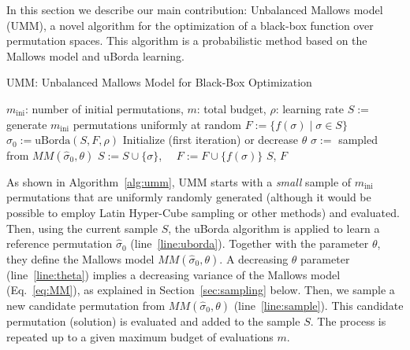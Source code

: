 \documentclass[runningheads]{llncs}
\newcommand{\assign}{\ensuremath{:=}}
\newcommand{\minit}{\ensuremath{m_\text{ini}}\xspace}
\newcommand{\FEmax}{\ensuremath{m}}
\begin{document}
In this section we describe our main contribution: Unbalanced Mallows model
(UMM), a novel algorithm for the optimization of a black-box function over
permutation spaces. This algorithm is a probabilistic method based on the
Mallows model and uBorda learning.


\begin{algorithm}[t]
 \caption{UMM: Unbalanced Mallows Model for Black-Box Optimization}
 \label{alg:umm}
  \begin{algorithmic}[1]
    \Require $\minit$: number of initial permutations, $\FEmax$: total budget, $\rho$: learning rate
    \State $S \assign $ generate $\minit$ permutations uniformly at random
    \State $F \assign \{ f(\sigma) \mid \sigma \in S\}$ 
    \For{$i \assign \minit$ \textbf{to} $\FEmax$ \text{evaluations}}
    \State $\hat\sigma_0 \assign \text{uBorda}(S, F,\rho)$\label{line:uborda}
    \State Initialize (first iteration) or decrease  $\theta$\label{line:theta}
    \State $\sigma \assign$ sampled from  $MM(\hat\sigma_0, \theta)$\label{line:sample}
    \State $S \assign S \cup \{\sigma\}$, $\quad F \assign F \cup \{f(\sigma)\}$
    \EndFor 
    \State \Return $S$, $F$
 \end{algorithmic}
\end{algorithm}


As shown in Algorithm~\ref{alg:umm}, UMM  starts with a \emph{small} sample of $\minit$ permutations that are uniformly randomly generated (although it would be possible to employ Latin Hyper-Cube sampling or other methods) and evaluated. Then, using the current sample $S$, the uBorda algorithm is applied to learn a reference permutation $\hat{\sigma}_0$ (line~\ref{line:uborda}). 
Together with the parameter $\theta$, they define the Mallows model $MM(\hat\sigma_0, \theta)$. 
A decreasing $\theta$ parameter (line~\ref{line:theta}) implies a decreasing variance of the Mallows model (Eq.~\ref{eq:MM}), as explained in  Section~\ref{sec:sampling} below. 
Then, we sample a new candidate permutation from  $MM(\hat\sigma_0, \theta)$ (line~\ref{line:sample}). This candidate permutation (solution) is evaluated and added to the sample $S$. The process is repeated up to a given maximum budget of evaluations $\FEmax$.
\end{document}
